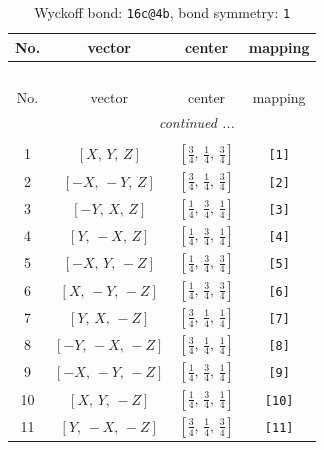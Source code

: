 \documentclass[fleqn,8pt]{jsarticle}
\begin{document}
\begin{longtable}{cccc}
\caption{Wyckoff bond: {\tt 16c@4b}, bond symmetry: {\tt 1}}
 \\
 \hline \hline
No. & vector & center & mapping \\ \hline \endfirsthead

\multicolumn{3}{l}{\tablename\ \thetable{}} \\
 \hline \hline
No. & vector & center & mapping \\ \hline \endhead

 \hline \hline
\multicolumn{3}{r}{\footnotesize\it continued ...} \\ \endfoot

 \hline \hline
\multicolumn{3}{r}{} \\ \endlastfoot

1 & $\left[ X,\, Y,\, Z \right]$ & $\left[ \frac{3}{4},\, \frac{1}{4},\, \frac{3}{4} \right]$ & {\tt [1]} \\ \hline
2 & $\left[ - X,\, - Y,\, Z \right]$ & $\left[ \frac{3}{4},\, \frac{1}{4},\, \frac{3}{4} \right]$ & {\tt [2]} \\ \hline
3 & $\left[ - Y,\, X,\, Z \right]$ & $\left[ \frac{1}{4},\, \frac{3}{4},\, \frac{1}{4} \right]$ & {\tt [3]} \\ \hline
4 & $\left[ Y,\, - X,\, Z \right]$ & $\left[ \frac{1}{4},\, \frac{3}{4},\, \frac{1}{4} \right]$ & {\tt [4]} \\ \hline
5 & $\left[ - X,\, Y,\, - Z \right]$ & $\left[ \frac{1}{4},\, \frac{3}{4},\, \frac{3}{4} \right]$ & {\tt [5]} \\ \hline
6 & $\left[ X,\, - Y,\, - Z \right]$ & $\left[ \frac{1}{4},\, \frac{3}{4},\, \frac{3}{4} \right]$ & {\tt [6]} \\ \hline
7 & $\left[ Y,\, X,\, - Z \right]$ & $\left[ \frac{3}{4},\, \frac{1}{4},\, \frac{1}{4} \right]$ & {\tt [7]} \\ \hline
8 & $\left[ - Y,\, - X,\, - Z \right]$ & $\left[ \frac{3}{4},\, \frac{1}{4},\, \frac{1}{4} \right]$ & {\tt [8]} \\ \hline
9 & $\left[ - X,\, - Y,\, - Z \right]$ & $\left[ \frac{1}{4},\, \frac{3}{4},\, \frac{1}{4} \right]$ & {\tt [9]} \\ \hline
10 & $\left[ X,\, Y,\, - Z \right]$ & $\left[ \frac{1}{4},\, \frac{3}{4},\, \frac{1}{4} \right]$ & {\tt [10]} \\ \hline
11 & $\left[ Y,\, - X,\, - Z \right]$ & $\left[ \frac{3}{4},\, \frac{1}{4},\, \frac{3}{4} \right]$ & {\tt [11]} \\ \hline

\end{longtable}
\end{document}
